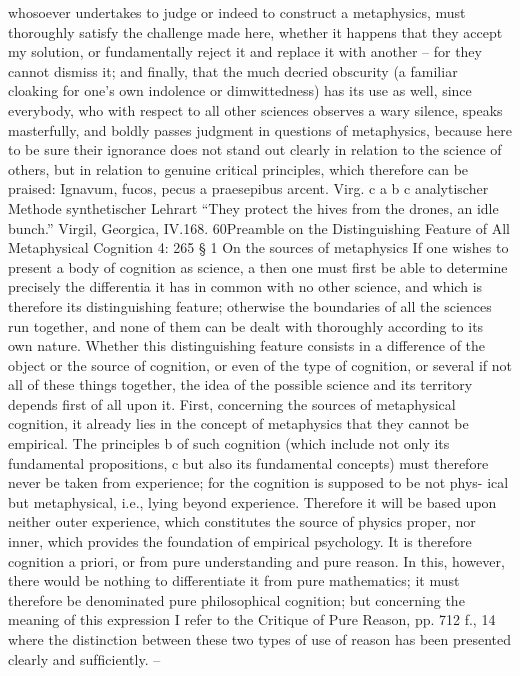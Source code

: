 whosoever undertakes to judge or indeed to construct a metaphysics,
must thoroughly satisfy the challenge made here, whether it happens that
they accept my solution, or fundamentally reject it and replace it with
another – for they cannot dismiss it; and ﬁnally, that the much decried
obscurity (a familiar cloaking for one’s own indolence or dimwittedness)
has its use as well, since everybody, who with respect to all other sciences
observes a wary silence, speaks masterfully, and boldly passes judgment
in questions of metaphysics, because here to be sure their ignorance does
not stand out clearly in relation to the science of others, but in relation
to genuine critical principles, which therefore can be praised:
Ignavum, fucos, pecus a praesepibus arcent. Virg. c
a
b
c
analytischer Methode
synthetischer Lehrart
“They protect the hives from the drones, an idle bunch.” Virgil, Georgica, IV.168.
60Preamble
on the
Distinguishing Feature of All
Metaphysical Cognition
4: 265
§ 1
On the sources of metaphysics
If one wishes to present a body of cognition as science, a then one must ﬁrst
be able to determine precisely the differentia it has in common with no
other science, and which is therefore its distinguishing feature; otherwise
the boundaries of all the sciences run together, and none of them can be
dealt with thoroughly according to its own nature.
Whether this distinguishing feature consists in a difference of the
object or the source of cognition, or even of the type of cognition, or several
if not all of these things together, the idea of the possible science and its
territory depends ﬁrst of all upon it.
First, concerning the sources of metaphysical cognition, it already
lies in the concept of metaphysics that they cannot be empirical. The
principles b of such cognition (which include not only its fundamental
propositions, c but also its fundamental concepts) must therefore never
be taken from experience; for the cognition is supposed to be not phys-
ical but metaphysical, i.e., lying beyond experience. Therefore it will
be based upon neither outer experience, which constitutes the source
of physics proper, nor inner, which provides the foundation of empirical
psychology. It is therefore cognition a priori, or from pure understanding
and pure reason.
In this, however, there would be nothing to differentiate it from
pure mathematics; it must therefore be denominated pure philosophical
cognition; but concerning the meaning of this expression I refer to the
Critique of Pure Reason, pp. 712 f., 14 where the distinction between these
two types of use of reason has been presented clearly and sufﬁciently. –

